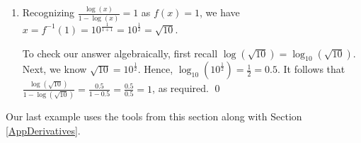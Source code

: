 \documentclass{ximera}
\begin{document}
\begin{example}
\begin{enumerate}
\item Recognizing   $\frac{\log(x)}{1-\log(x)} = 1$ as $f(x) = 1$, we have $x = f^{-1}(1) = 10^{\frac{1}{1+1}} = 10^{\frac{1}{2}} = \sqrt{10}$.

To check our answer algebraically,  first recall  $\log(\sqrt{10}) = \log_{10}(\sqrt{10})$.  Next, we know $\sqrt{10} = 10^{\frac{1}{2}}$.  Hence, $\log_{10} \left(10^{\frac{1}{2}} \right) = \frac{1}{2} = 0.5$.  It follows that $\frac{\log(\sqrt{10})}{1-\log(\sqrt{10})} = \frac{0.5}{1-0.5} = \frac{0.5}{0.5} = 1$, as required.  \qed

\end{enumerate}

\end{example}

\pagebreak

Our last example uses the tools from this section along with Section \ref{AppDerivatives}.
\end{document}
